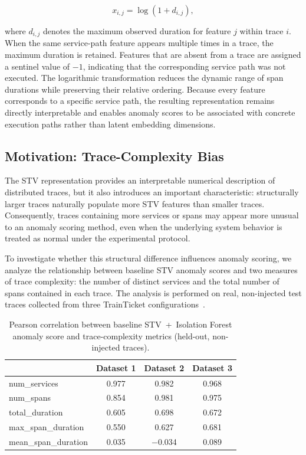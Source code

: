 \documentclass[informatics,article,submit,moreauthors]{Definitions/mdpi}
\newcommand{\rev}[1]{{\color{revisionblue}#1}}
\begin{document}
\begin{equation}
	x_{i,j}=\log\!\left(1+d_{i,j}\right),
	\label{eq:stv-value}
\end{equation}

where \(d_{i,j}\) denotes the maximum observed duration for feature \(j\)
within trace \(i\). When the same service-path feature appears multiple
times in a trace, the maximum duration is retained. Features that are
absent from a trace are assigned a sentinel value of \(-1\), indicating
that the corresponding service path was not executed. The logarithmic
transformation reduces the dynamic range of span durations while
preserving their relative ordering. Because every feature corresponds to
a specific service path, the resulting representation remains directly
interpretable and enables anomaly scores to be associated with concrete
execution paths rather than latent embedding dimensions.

\subsection{Motivation: Trace-Complexity Bias}
\label{sec:complexity-bias-background}

The STV representation provides an interpretable numerical description
of distributed traces, but it also introduces an important
characteristic: structurally larger traces naturally populate more STV
features than smaller traces. Consequently, traces containing more
services or spans may appear more unusual to an anomaly scoring method,
even when the underlying system behavior is \rev{treated as normal under the experimental protocol}.

To investigate whether this structural difference influences anomaly
scoring, we analyze the relationship between baseline STV anomaly scores
and two measures of trace complexity: the number of distinct services
and the total number of spans contained in each trace. The analysis is
performed on real, non-injected test traces collected from three
TrainTicket configurations~\cite{zhou2021trainticket}.

\begin{table}[t]
	\centering
	\caption{Pearson correlation between baseline STV~+~Isolation Forest anomaly
		score and trace-complexity metrics (held-out, non-injected traces).}
	\label{tab:complexity-bias-baseline}
	\begin{tabular}{lccc}
		\toprule
		& \textbf{Dataset 1} & \textbf{Dataset 2} & \textbf{Dataset 3} \\
		\midrule
		num\_services      & 0.977 & 0.982 & 0.968 \\
		num\_spans         & 0.854 & 0.981 & 0.975 \\
		total\_duration    & 0.605 & 0.698 & 0.672 \\
		max\_span\_duration & 0.550 & 0.627 & 0.681 \\
		mean\_span\_duration & 0.035 & $-$0.034 & 0.089 \\
		\bottomrule
	\end{tabular}
\end{table}
\end{document}
